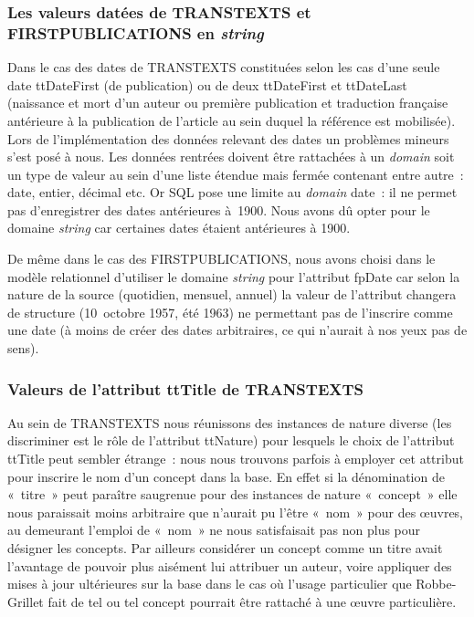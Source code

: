 \documentclass[12pt, a4paper]{article}
\begin{document}
\subsubsection{Les valeurs datées de TRANSTEXTS et FIRSTPUBLICATIONS en \textit{string}}
Dans le cas des dates de TRANSTEXTS constituées selon les cas d'une seule date ttDateFirst (de publication) ou de deux ttDateFirst et ttDateLast (naissance et mort d'un auteur ou première publication et traduction française antérieure à la publication de l'article au sein duquel la référence est mobilisée). Lors de l'implémentation des données relevant des dates un problèmes mineurs s'est posé à nous. Les données rentrées doivent être rattachées à un \textit{domain} soit un type de valeur au sein d'une liste étendue mais fermée contenant entre autre~: date, entier, décimal etc. Or SQL pose une limite au \textit{domain} date~: il ne permet pas d'enregistrer des dates antérieures à~1900. Nous avons dû opter pour le domaine \textit{string} car certaines dates étaient antérieures à 1900.

De même dans le cas des FIRSTPUBLICATIONS, nous avons choisi dans le modèle relationnel d'utiliser le domaine \textit{string} pour l'attribut fpDate car selon la nature de la source (quotidien, mensuel, annuel) la valeur de l'attribut changera de structure (10~octobre 1957, été 1963) ne permettant pas de l'inscrire comme une date (à moins de créer des dates arbitraires, ce qui n'aurait à nos yeux pas de sens).


\subsubsection{Valeurs de l'attribut ttTitle de TRANSTEXTS}

Au sein de TRANSTEXTS nous réunissons des instances de nature diverse (les discriminer est le rôle de l'attribut ttNature) pour lesquels le choix de l'attribut ttTitle peut sembler étrange~: nous nous trouvons parfois à employer cet attribut pour inscrire le nom d'un concept dans la base. En effet si la dénomination de «~titre~» peut paraître saugrenue pour des instances de nature «~concept~» elle nous paraissait moins arbitraire que n'aurait pu l'être «~nom~» pour des œuvres, au demeurant l'emploi de «~nom~» ne nous satisfaisait pas non plus pour désigner les concepts. Par ailleurs considérer un concept comme un titre avait l'avantage de pouvoir plus aisément lui attribuer un auteur, voire appliquer des mises à jour ultérieures sur la base dans le cas où l'usage particulier que Robbe-Grillet fait de tel ou tel concept pourrait être rattaché à une œuvre particulière.
\end{document}
